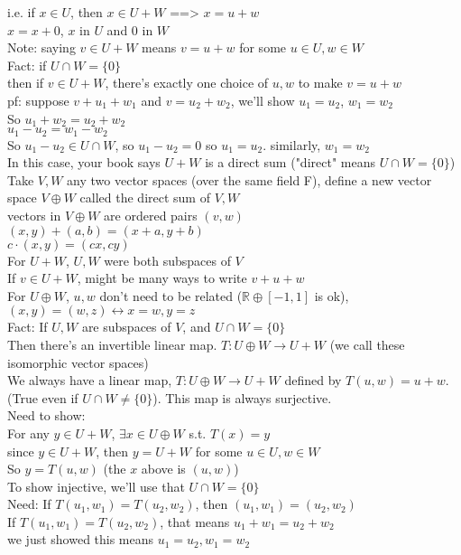 \documentclass[11pt]{article}
\begin{document}
i.e. if $x\in U$, then $x\in U+W$ ==> $x=u+w$\\
$x=x+0$, $x$ in $U$ and 0 in $W$\\
Note: saying $v\in U+W$ means $v=u+w$ for some $u\in U, w\in W$\\
Fact: if $U\cap W=\{0\}$\\
then if $v\in U+W$, there's exactly one choice of $u, w$ to make $v=u+w$\\
pf: suppose $v+u_1+w_1$ and $v=u_2+w_2$, we'll show $u_1=u_2$, $w_1=w_2$\\
So $u_1+w_2=u_2+w_2$\\
$u_1-u_2=w_1-w_2$\\
So $u_1-u_2\in U\cap W$, so $u_1-u_2=0$ so $u_1=u_2$. similarly, $w_1=w_2$\\
In this case, your book says $U+W$ is a direct sum ("direct" means $U\cap W=\{0\}$)\\
Take $V, W$ any two vector spaces (over the same field F), define a new vector space $V\oplus W$ called the direct sum of $V, W$\\
vectors in $V\oplus W$ are ordered pairs $(v, w)$\\
$(x, y)+(a, b)=(x+a, y+b)$\\
$c\cdot (x, y)=(cx, cy)$\\
For $U+W$, $U, W$ were both subspaces of $V$\\
If $v\in U+W$, might be many ways to write $v+u+w$\\
For $U\oplus W$, $u, w$ don't need to be related ($\mathbb{R}\oplus [-1, 1]$ is ok), $(x, y)=(w, z) \leftrightarrow x=w, y=z$\\
Fact: If $U, W$ are subspaces of $V$, and $U\cap W=\{0\}$\\
Then there's an invertible linear map. $T: U\oplus W\rightarrow U+W$ (we call these isomorphic vector spaces)\\
We always have a linear map, $T: U\oplus W\rightarrow U+W$ defined by $T(u, w)=u+w$. (True even if $U\cap W\neq \{0\}$). This map is always surjective.\\
Need to show:\\
For any $y\in U+W$, $\exists x\in U\oplus W$ s.t. $T(x)=y$\\
since $y\in U+W$, then $y=U+W$ for some $u\in U, w\in W$\\
So $y=T(u, w)$ (the $x$ above is $(u, w)$)\\
To show injective, we'll use that $U\cap W=\{0\}$\\
Need: If $T(u_1, w_1)=T(u_2, w_2)$, then $(u_1, w_1)=(u_2, w_2)$\\
If $T(u_1, w_1)=T(u_2, w_2)$, that means $u_1+w_1=u_2+w_2$\\
we just showed this means $u_1=u_2, w_1=w_2$
\end{document}
